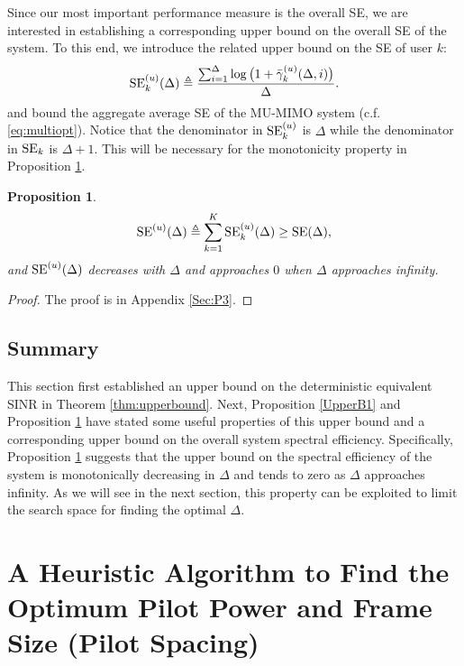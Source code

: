 \documentclass[conference, a4paper, 10pt]{IEEEtran}
\newtheorem{prop}{Proposition}
\begin{document}
Since our most important performance measure is the overall \ac{SE}, we are interested in establishing a corresponding upper bound on the overall \ac{SE} of the system.
To this end,
we introduce the related upper bound on the \ac{SE} of user $k$:
\begin{align}
\label{eq:SEku}
	\textup{SE}_k^{(u)}(\Delta) \triangleq \frac{ \sum_{i=1}^{\Delta}\log\big(1 + \bar{\gamma}^{(u)}_k(\Delta, i) \big) }{\Delta}.
\end{align}
and bound the aggregate average \ac{SE} of the \ac{MU-MIMO} system (c.f. \eqref{eq:multiopt}).
Notice that the denominator in $\textup{SE}_k^{(u)}$ is $\Delta$ while the denominator in $\textup{SE}_k$ is $\Delta + 1$.
This will be necessary for the monotonicity property in Proposition \ref{UpperB2}.
\begin{prop}
\label{UpperB2}
	\begin{align}
	\label{eq:SEupper}
	\textup{SE}^{(u)}(\Delta) \triangleq \sum_{k=1}^K \textup{SE}_k^{(u)}(\Delta)
	\geq \textup{SE}(\Delta),
	\end{align}
	and $\textup{SE}^{(u)}(\Delta)$ decreases with $\Delta$ and approaches $0$ when $\Delta$ approaches infinity.
\end{prop}

\begin{proof}
The proof is in Appendix \ref{Sec:P3}.
\end{proof}

\subsection{Summary}
This section first established an upper bound on the deterministic equivalent \ac{SINR} in Theorem \ref{thm:upperbound}. Next, Proposition \ref{UpperB1} and Proposition \ref{UpperB2} have stated some useful properties of this upper bound and a corresponding upper bound on the overall system spectral efficiency. Specifically, Proposition \ref{UpperB2} suggests that the upper bound on the spectral efficiency of the system is monotonically decreasing in $\Delta$ and tends to zero as $\Delta$ approaches infinity. As we will see in the next section, this property can be exploited to limit the search space for finding the optimal $\Delta$.

\section{A Heuristic Algorithm to Find the Optimum Pilot Power and Frame Size (Pilot Spacing)}
\label{Sec:Alg}
\end{document}
